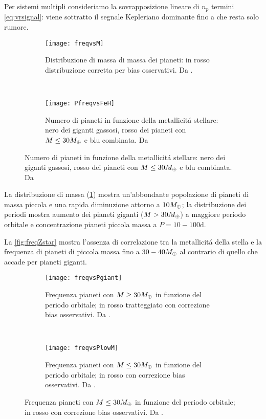 Per sistemi multipli consideriamo la sovrapposizione lineare di $n_p$ termini \eqref{eq:vrsignal}: viene sottratto il segnale Kepleriano dominante fino a che resta solo rumore.

\begin{figure}[!ht]
\begin{subfigure}[b]{0.49\textwidth} \centering \texttt{[image: freqvsM]}
\caption{Distribuzione di massa di massa dei pianeti: in rosso distribuzione corretta per bias osservativi. Da \cite{mayor2011harps}.}\label{fig:freqvsM} \end{subfigure}
~
\begin{subfigure}[b]{0.49\textwidth} \centering \texttt{[image: PfreqvsFeH]}\label{fig:PfreqvsFeH}
\caption{Numero di pianeti in funzione della metallicit\'a stellare: nero dei giganti gassosi, rosso dei pianeti con $M\leq30M_{\oplus}{}$ e blu combinata. Da \cite{mayor2011harps}}
\end{subfigure}
\end{figure}

La distribuzione di massa (\ref{fig:freqvsM}) mostra un'abbondante popolazione di pianeti di massa piccola e una rapida diminuzione attorno a $10M_{\oplus}{}$; la distribuzione dei periodi mostra aumento dei pianeti giganti ($M>30M_{\oplus}{}$) a maggiore periodo orbitale e concentrazione pianeti piccola massa a $P=10-100\si{\day}$.

La \ref{fig:freqZstar} mostra l'assenza di correlazione tra la metallicit\'a della stella e la frequenza di pianeti di piccola massa fino a $30-40M_{\oplus}{}$ al contrario di quello che accade per pianeti giganti.

\begin{figure}[!ht]
\begin{subfigure}[b]{0.49\textwidth} \centering \texttt{[image: freqvsPgiant]}\caption{Frequenza pianeti con $M\geq 30M_{\oplus}{}$ in funzione del periodo orbitale; in rosso  tratteggiato con correzione bias osservativi. Da \cite{mayor2011harps}.}\label{fig:freqvsPgiant} \end{subfigure}
~
\begin{subfigure}[b]{0.49\textwidth} \centering \texttt{[image: freqvsPlowM]}\label{fig:freqvsPlowM} \caption{Frequenza pianeti con $M\leq 30M_{\oplus}{}$ in funzione del periodo orbitale; in rosso con correzione bias osservativi. Da \cite{mayor2011harps}.}
\end{subfigure}
\end{figure}

